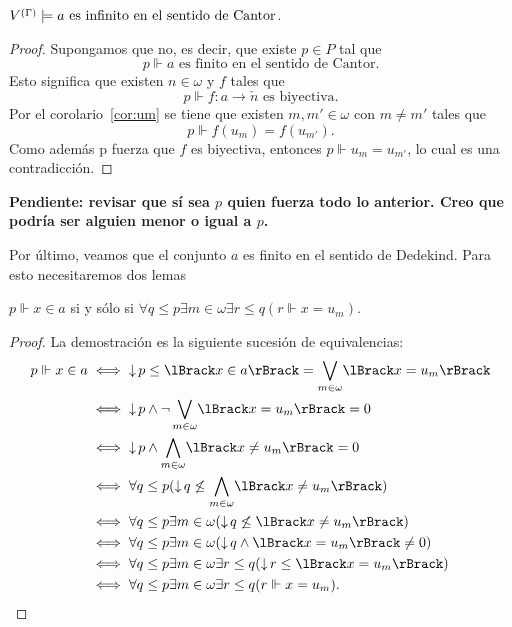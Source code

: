 \documentclass[letterpaper,DIV=15,12pt]{scrartcl}
\DeclarePairedDelimiter{\vb}{\lBrack}{\rBrack}             %
\DeclareMathOperator{\abajo}{\downarrow}                   %
\begin{document}
\begin{corollary}
    \(\mg\models a\text{ es infinito en el sentido de Cantor}\).
\end{corollary}
\begin{proof}
    Supongamos que no, es decir, que existe \(p\in P\) tal que
    \begin{equation*}
        p\Vdash a \text{ es finito en el sentido de Cantor}.
    \end{equation*}
    Esto significa que existen \(n\in\omega\) y \(f\) tales que
    \begin{equation*}
        p\Vdash f\colon a\to\check{n} \text{ es biyectiva}.
    \end{equation*}
    Por el corolario~\ref{cor:um} se tiene que existen \(m,m'\in\omega\) con
    \(m\ne m'\) tales que
    \begin{equation*}
        p\Vdash f(u_m)=f(u_{m'}).
    \end{equation*}
    Como además p fuerza que \(f\) es biyectiva, entonces \(p\Vdash
    u_m=u_{m'}\), lo cual es una contradicción.
\end{proof}

\textbf{Pendiente: revisar que sí sea \(p\) quien fuerza todo lo anterior. 
Creo que podría ser alguien menor o igual a \(p\).}

Por último, veamos que el conjunto \(a\) es finito en el sentido de Dedekind.
Para esto necesitaremos dos lemas

\begin{lemma}[label=lema:forzarxena]
    \(p\Vdash x\in a\) si y sólo si 
    \(\forall q\leq p\exists m\in\omega\exists r\leq q (r\Vdash x=u_m)\).
\end{lemma}
\begin{proof}
    La demostración es la siguiente sucesión de equivalencias:
    \begin{align*}
        p\Vdash x\in a 
        & \iff \abajo p\leq\vb{x\in a}=\bigvee_{m\in\omega}\vb{x=u_m} \\
        & \iff \abajo p\land \neg\bigvee_{m\in\omega}\vb{x=u_m}=0 \\
        & \iff \abajo p\land\bigwedge_{m\in\omega}\vb{x\ne u_m}=0 \\
        & \iff \forall q\leq p(\abajo q\not\leq\bigwedge_{m\in\omega}\vb{x\ne u_m}) \\
        & \iff \forall q\leq p\exists m\in\omega(\abajo q\not\leq\vb{x\ne u_m}) \\
        & \iff \forall q\leq p\exists m\in\omega(\abajo q\land\vb{x=u_m}\ne 0) \\
        & \iff \forall q\leq p\exists m\in\omega\exists r\leq q(\abajo r\leq\vb{x=u_m}) \\
        & \iff \forall q\leq p\exists m\in\omega\exists r\leq q(r\Vdash x=u_m).
         \qedhere
    \end{align*}
\end{proof}
\end{document}
